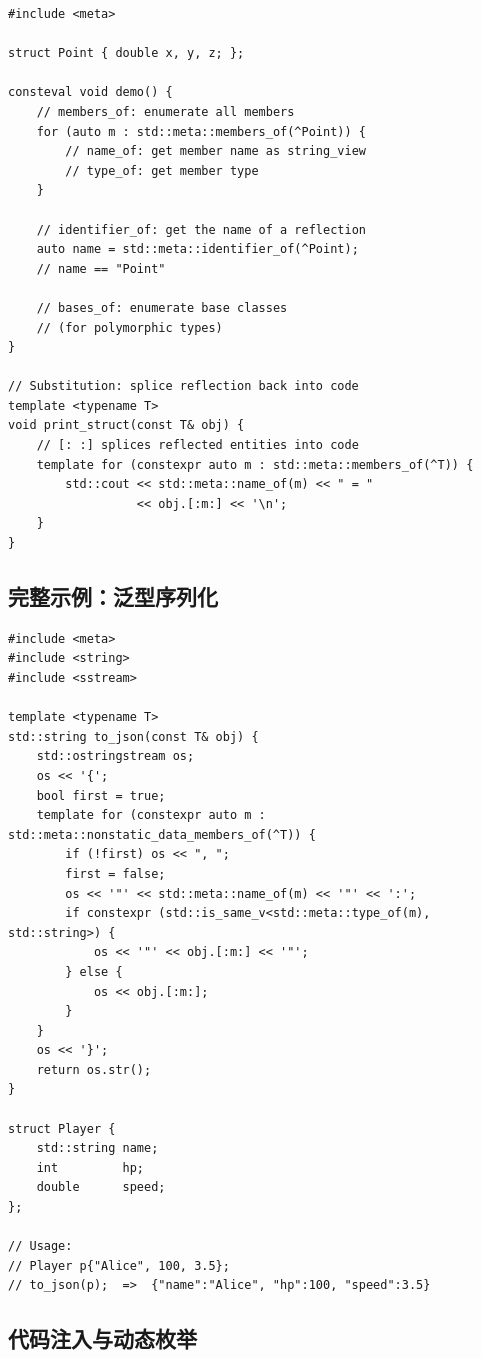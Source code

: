 \documentclass[12pt,a4paper,fontset=fandol]{ctexbook}
\begin{document}
\begin{lstlisting}[language=Cpp26,caption={C++26 反射: 核心 API 一览}]
#include <meta>

struct Point { double x, y, z; };

consteval void demo() {
    // members_of: enumerate all members
    for (auto m : std::meta::members_of(^Point)) {
        // name_of: get member name as string_view
        // type_of: get member type
    }

    // identifier_of: get the name of a reflection
    auto name = std::meta::identifier_of(^Point);
    // name == "Point"

    // bases_of: enumerate base classes
    // (for polymorphic types)
}

// Substitution: splice reflection back into code
template <typename T>
void print_struct(const T& obj) {
    // [: :] splices reflected entities into code
    template for (constexpr auto m : std::meta::members_of(^T)) {
        std::cout << std::meta::name_of(m) << " = "
                  << obj.[:m:] << '\n';
    }
}
\end{lstlisting}

\subsection{完整示例：泛型序列化}

\begin{lstlisting}[language=Cpp26,caption={C++26 反射: 泛型 JSON 序列化器}]
#include <meta>
#include <string>
#include <sstream>

template <typename T>
std::string to_json(const T& obj) {
    std::ostringstream os;
    os << '{';
    bool first = true;
    template for (constexpr auto m : std::meta::nonstatic_data_members_of(^T)) {
        if (!first) os << ", ";
        first = false;
        os << '"' << std::meta::name_of(m) << '"' << ':';
        if constexpr (std::is_same_v<std::meta::type_of(m), std::string>) {
            os << '"' << obj.[:m:] << '"';
        } else {
            os << obj.[:m:];
        }
    }
    os << '}';
    return os.str();
}

struct Player {
    std::string name;
    int         hp;
    double      speed;
};

// Usage:
// Player p{"Alice", 100, 3.5};
// to_json(p);  =>  {"name":"Alice", "hp":100, "speed":3.5}
\end{lstlisting}

\subsection{代码注入与动态枚举}
\end{document}
